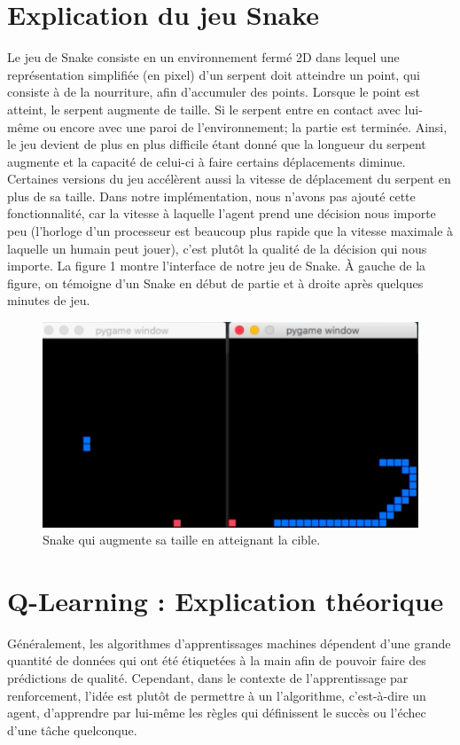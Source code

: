 \documentclass{article}
\begin{document}
\section{Explication du jeu Snake }
Le jeu de Snake consiste en un environnement fermé 2D dans lequel une représentation simplifiée (en pixel) d'un serpent doit atteindre un point, qui consiste à de la nourriture, afin d'accumuler des points. Lorsque le point est atteint, le serpent augmente de taille. Si le serpent entre en contact avec lui-même ou encore avec une paroi de l'environnement; la partie est terminée. Ainsi, le jeu devient de plus en plus difficile étant donné que la longueur du serpent augmente et la capacité de celui-ci à faire certains déplacements diminue. Certaines versions du jeu accélèrent aussi la vitesse de déplacement du serpent en plus de sa taille. Dans notre implémentation, nous n'avons pas ajouté cette fonctionnalité, car la vitesse à laquelle l'agent prend une décision nous importe peu (l'horloge d'un processeur est beaucoup plus rapide que la vitesse maximale à laquelle un humain peut jouer), c'est plutôt la qualité de la décision qui nous importe. La figure 1 montre l'interface de notre jeu de Snake. À gauche de la figure, on témoigne d'un Snake en début de partie et à droite après quelques minutes de jeu. 
\begin{figure}[ht]
\includegraphics[width=\linewidth]{snake.png}
\caption{Snake qui augmente sa taille en atteignant la cible.}
\label{fig:Snake}
\end{figure}

\section{Q-Learning : Explication théorique  }
Généralement, les algorithmes d’apprentissages machines dépendent d’une grande quantité de données qui ont été étiquetées à la main afin de pouvoir faire des prédictions de qualité. Cependant, dans le contexte de l'apprentissage par renforcement, l’idée est plutôt de permettre à un l’algorithme, c’est-à-dire un agent, d’apprendre par lui-même les règles qui définissent le succès ou l’échec d’une tâche quelconque.\linebreak
\end{document}

